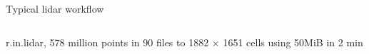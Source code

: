 \documentclass[xcolor={dvipsnames,usenames},beamer,aspectratio=169]{beamer}
\begin{document}
\begin{frame}{Typical lidar workflow}
\begin{columns}
\begin{column}{0.45\textwidth}
\begin{center}
  \footnotesize
  r.in.lidar, 578 million points in 90 files to 1882 $\times$ 1651 cells using 50MiB in 2 min

%
%


\end{center}

\end{column}
\end{columns}

\end{frame}
\end{document}
